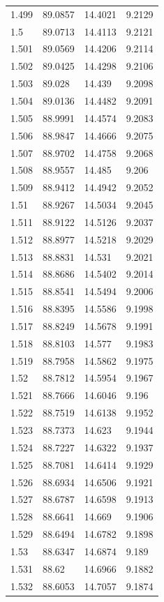 \begin{tabular}{llll}
1.499 & 89.0857 & 14.4021 & 9.2129 \\
1.5 & 89.0713 & 14.4113 & 9.2121 \\
1.501 & 89.0569 & 14.4206 & 9.2114 \\
1.502 & 89.0425 & 14.4298 & 9.2106 \\
1.503 & 89.028 & 14.439 & 9.2098 \\
1.504 & 89.0136 & 14.4482 & 9.2091 \\
1.505 & 88.9991 & 14.4574 & 9.2083 \\
1.506 & 88.9847 & 14.4666 & 9.2075 \\
1.507 & 88.9702 & 14.4758 & 9.2068 \\
1.508 & 88.9557 & 14.485 & 9.206 \\
1.509 & 88.9412 & 14.4942 & 9.2052 \\
1.51 & 88.9267 & 14.5034 & 9.2045 \\
1.511 & 88.9122 & 14.5126 & 9.2037 \\
1.512 & 88.8977 & 14.5218 & 9.2029 \\
1.513 & 88.8831 & 14.531 & 9.2021 \\
1.514 & 88.8686 & 14.5402 & 9.2014 \\
1.515 & 88.8541 & 14.5494 & 9.2006 \\
1.516 & 88.8395 & 14.5586 & 9.1998 \\
1.517 & 88.8249 & 14.5678 & 9.1991 \\
1.518 & 88.8103 & 14.577 & 9.1983 \\
1.519 & 88.7958 & 14.5862 & 9.1975 \\
1.52 & 88.7812 & 14.5954 & 9.1967 \\
1.521 & 88.7666 & 14.6046 & 9.196 \\
1.522 & 88.7519 & 14.6138 & 9.1952 \\
1.523 & 88.7373 & 14.623 & 9.1944 \\
1.524 & 88.7227 & 14.6322 & 9.1937 \\
1.525 & 88.7081 & 14.6414 & 9.1929 \\
1.526 & 88.6934 & 14.6506 & 9.1921 \\
1.527 & 88.6787 & 14.6598 & 9.1913 \\
1.528 & 88.6641 & 14.669 & 9.1906 \\
1.529 & 88.6494 & 14.6782 & 9.1898 \\
1.53 & 88.6347 & 14.6874 & 9.189 \\
1.531 & 88.62 & 14.6966 & 9.1882 \\
1.532 & 88.6053 & 14.7057 & 9.1874 \\

\end{tabular}

